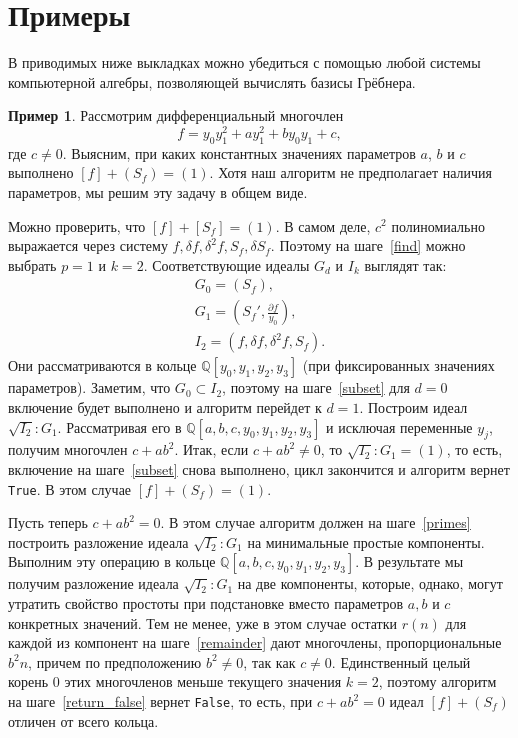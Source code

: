 \documentclass[11pt]{article}
\theoremstyle{plain1}
\theoremstyle{plain2}
\theoremstyle{plain}
\theoremstyle{plain3}
\theoremstyle{definition}
\newtheorem{example}[theorem3]{Пример}
\theoremstyle{remark}
\begin{document}
\section{Примеры}
В приводимых ниже выкладках можно убедиться с помощью любой системы компьютерной алгебры, позволяющей вычислять базисы Грёбнера.

\label{examples}
\begin{example}\label{example:first}
Рассмотрим дифференциальный многочлен 
$$
f= y_0 y_1^2+ay_1^2+by_0 y_1+c,
$$
где $c \ne 0$.
Выясним, при каких константных значениях параметров $a$, $b$ и $c$ выполнено $[f]+(S_f)=(1)$.
Хотя наш алгоритм не предполагает наличия параметров, мы решим эту задачу в общем виде.

Можно проверить, что $[f] + [S_f] = (1)$.
В самом деле, $c^2$ полиномиально выражается через систему $f, \delta f, \delta^2 f, S_f, \delta {S_f}$.
Поэтому на шаге~\ref{find} можно выбрать $p = 1$ и $k=2$.
Соответствующие идеалы $G_d$ и $I_k$ выглядят так:
\begin{gather*}
G_0 = (S_f),\\
G_1 = \left({S_f}', \frac{\partial f}{y_0} \right),\\
I_2 = \left(f, \delta f, \delta^2 f, S_f\right).
\end{gather*}
Они рассматриваются в кольце $\mathbb{Q}[y_0, y_1, y_2, y_3]$ (при фиксированных значениях параметров).
Заметим, что $G_0 \subset I_2$, поэтому на шаге~\ref{subset} для $d=0$ включение будет выполнено и алгоритм перейдет к $d=1$.
Построим идеал $\sqrt{I_2}:G_1$.
Рассматривая его в $\mathbb{Q}[a,b,c,y_0,y_1, y_2, y_3]$ и исключая переменные $y_j$, получим многочлен $c + a b^2$.
Итак, если $c + ab^2 \ne 0$, то $\sqrt{I_2}:G_1 = (1)$, то есть, включение на шаге~\ref{subset} снова выполнено,
цикл закончится и алгоритм вернет \verb'True'. В этом случае $[f] + (S_f) = (1)$.

Пусть теперь $c + a b^2 = 0$.
В этом случае алгоритм должен на шаге~\ref{primes} построить разложение идеала $\sqrt{I_2}:G_1$
на минимальные простые компоненты. 
Выполним эту операцию в кольце $\mathbb{Q}[a,b,c,y_0,y_1,y_2,y_3]$.
В результате мы получим разложение идеала $\sqrt{I_2}:G_1$ на две компоненты,
которые, однако, могут утратить свойство простоты при подстановке вместо параметров $a, b$ и $c$ конкретных значений.
Тем не менее, уже в этом случае остатки $r(n)$ для каждой из компонент на шаге~\ref{remainder} дают многочлены,
пропорциональные $b^2 n$, причем по предположению $b^2 \ne 0$, так как $c \ne 0$.
Единственный целый корень $0$ этих многочленов меньше текущего значения $k = 2$,
поэтому алгоритм на шаге~\ref{return_false} вернет \verb'False', то есть,
при $c + a b^2 = 0$ идеал $[f] + (S_f)$ отличен от всего кольца.
\end{example}
\end{document}
